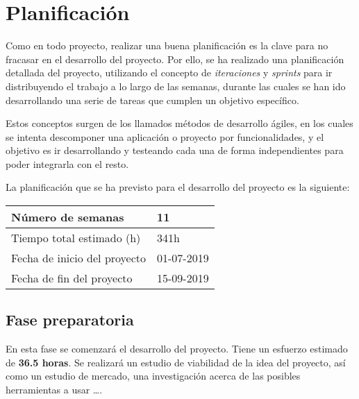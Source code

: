 


\pagestyle{miEstilo2}

\section{Planificación}

Como en todo proyecto, realizar una buena planificación es la clave para no fracasar en el desarrollo del proyecto. Por ello, se ha realizado una planificación detallada del proyecto, utilizando el concepto de \textit{iteraciones} y \textit{sprints} para ir distribuyendo el trabajo a lo largo de las semanas, durante las cuales se han ido desarrollando una serie de tareas que cumplen un objetivo específico.

Estos conceptos surgen de los llamados métodos de desarrollo ágiles, en los cuales se intenta descomponer una aplicación o proyecto por funcionalidades, y el objetivo es ir desarrollando y testeando cada una de forma independientes para poder integrarla con el resto.

La planificación que se ha previsto para el desarrollo del proyecto es la siguiente:

\begin{table}[h!]
\centering
\begin{tabular}{|p{5cm}|p{4cm}|}
 \hline
	\cellcolor[gray]{0.9} Número de semanas  & 11\\ \hline
	\cellcolor[gray]{0.9} Tiempo total estimado (h)  & 341h \\ \hline
	\cellcolor[gray]{0.9} Fecha de inicio del proyecto  & 01-07-2019 \\ \hline
	\cellcolor[gray]{0.9} Fecha de fin del proyecto  & 15-09-2019 \\ \hline
		
\end{tabular}
\end{table}

\subsection{Fase preparatoria}

En esta fase se comenzará el desarrollo del proyecto. Tiene un esfuerzo estimado de \textbf{36.5 horas}. Se realizará un estudio de viabilidad de la idea del proyecto, así como un estudio de mercado, una investigación acerca de las posibles herramientas a usar \ldots.


